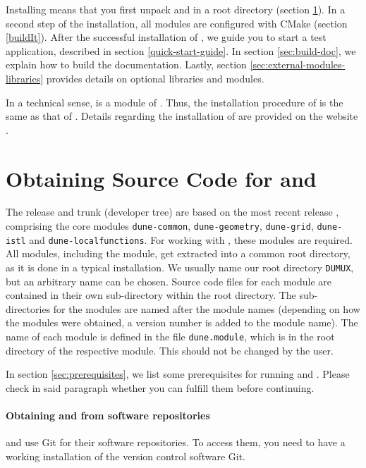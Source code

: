 Installing \Dumux means that you first unpack \Dune and \Dumux in a root directory
(section \ref{sc:ObtainingSourceCode}).
In a second step of the installation, all modules are configured with CMake
(section \ref{buildIt}).
After the successful installation of \Dumux, we guide you to start a test application,
described in section \ref{quick-start-guide}.
In section \ref{sec:build-doc}, we explain how to build the \Dumux documentation.
Lastly, section \ref{sec:external-modules-libraries} provides details on optional libraries and modules.

In a technical sense, \Dumux is a module of \Dune.
Thus, the installation procedure of \Dumux is the same as that of \Dune.
Details regarding the installation of \Dune are provided on the \Dune website \cite{DUNE-HP}.


\section{Obtaining Source Code for \Dune and \Dumux}
\label{sc:ObtainingSourceCode}
The \Dumux release and trunk (developer tree) are based on the most recent
\Dune release \DuneVersion, comprising the core modules \texttt{dune-common}, \texttt{dune-geometry},
\texttt{dune-grid}, \texttt{dune-istl} and \texttt{dune-localfunctions}.
For working with \Dumux, these modules are required.
All \Dune modules, including the \Dumux module, get extracted into a common root directory, as it
is done in a typical \Dune installation.
We usually name our root directory \texttt{DUMUX}, but an arbitrary name can be chosen.
Source code files for each \Dune module are contained in their own sub-directory within the root directory.
The sub-directories for the modules are named after the module names (depending on how
the modules were obtained, a version number is added to the module name).
The name of each \Dune module is defined in the file \texttt{dune.module}, which is
in the root directory of the respective module. This should not be changed by the user.

In section \ref{sec:prerequisites}, we list some prerequisites for running \Dune and \Dumux.
Please check in said paragraph whether you can fulfill them before continuing.

\paragraph{Obtaining \Dune and \Dumux from software repositories}
\Dune and \Dumux use Git for their software repositories. To access them,
you need to have a working installation of the version control software Git.

